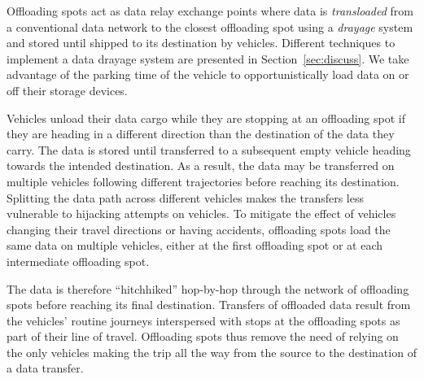 

Offloading spots act as data relay exchange points where data is \textit{transloaded} from a conventional data network to the closest offloading spot using a \textit{drayage} system and stored until shipped to its destination by vehicles. Different techniques to implement a data drayage system are presented in Section~\ref{sec:discuss}. We take advantage of the parking time of the vehicle to opportunistically load data on or off their storage devices. 

Vehicles unload their data cargo while they are stopping at an offloading spot if they are heading in a different direction than the destination of the data they carry. The data is stored until transferred to a subsequent empty vehicle heading towards the intended destination. As a result, the data may be transferred on multiple vehicles following different trajectories before reaching its destination. Splitting the data path across different vehicles makes the transfers less vulnerable to hijacking attempts on vehicles. To mitigate the effect of vehicles changing their travel directions or having accidents, offloading spots load the same data on multiple vehicles, either at the first offloading spot or at each intermediate offloading spot.

The data is therefore ``hitchhiked'' hop-by-hop through the network of offloading spots before reaching its final destination. Transfers of offloaded data result from the vehicles' routine journeys interspersed with stops at the offloading spots as part of their line of travel. Offloading spots thus remove the need of relying on the only vehicles making the trip all the way from the source to the destination of a data transfer.

